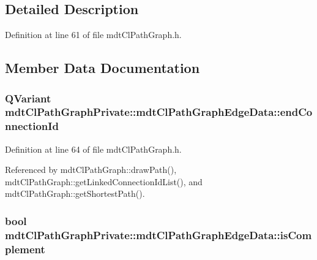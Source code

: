 \subsection{Detailed Description}


Definition at line 61 of file mdt\-Cl\-Path\-Graph.\-h.



\subsection{Member Data Documentation}
\hypertarget{structmdt_cl_path_graph_private_1_1mdt_cl_path_graph_edge_data_a6dfdd2c68bdec4556ab367517737b7a1}{
\subsubsection[{end\-Connection\-Id}]{\setlength{\rightskip}{0pt plus 5cm}Q\-Variant mdt\-Cl\-Path\-Graph\-Private\-::mdt\-Cl\-Path\-Graph\-Edge\-Data\-::end\-Connection\-Id}}\label{structmdt_cl_path_graph_private_1_1mdt_cl_path_graph_edge_data_a6dfdd2c68bdec4556ab367517737b7a1}


Definition at line 64 of file mdt\-Cl\-Path\-Graph.\-h.



Referenced by mdt\-Cl\-Path\-Graph\-::draw\-Path(), mdt\-Cl\-Path\-Graph\-::get\-Linked\-Connection\-Id\-List(), and mdt\-Cl\-Path\-Graph\-::get\-Shortest\-Path().

\hypertarget{structmdt_cl_path_graph_private_1_1mdt_cl_path_graph_edge_data_a423302ffa14fedbb80f362f9f44960d7}{
\subsubsection[{is\-Complement}]{\setlength{\rightskip}{0pt plus 5cm}bool mdt\-Cl\-Path\-Graph\-Private\-::mdt\-Cl\-Path\-Graph\-Edge\-Data\-::is\-Complement}}\label{structmdt_cl_path_graph_private_1_1mdt_cl_path_graph_edge_data_a423302ffa14fedbb80f362f9f44960d7}



